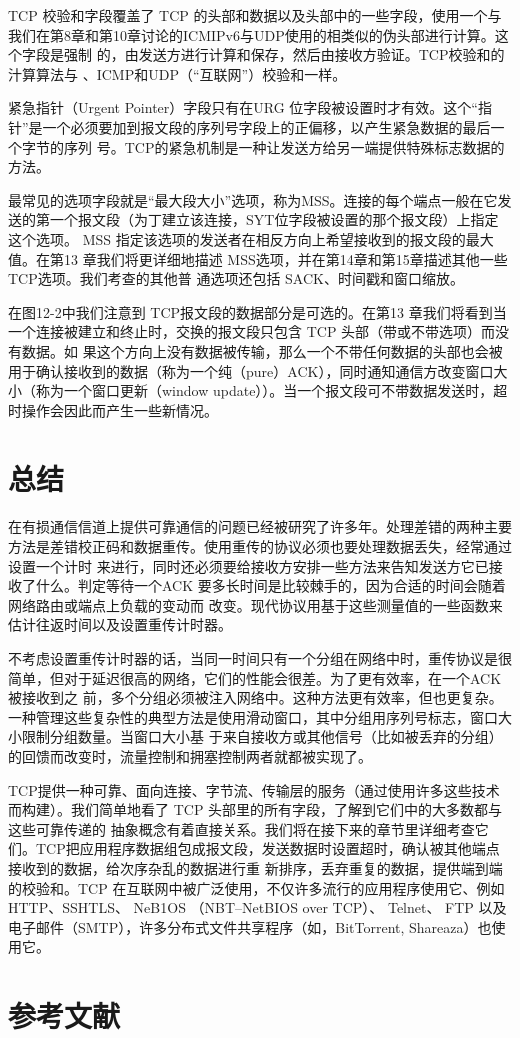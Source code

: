 TCP 校验和字段覆盖了 TCP 的头部和数据以及头部中的一些字段，使用一个与我们在第8章和第10章讨论的ICMIPv6与UDP使用的相类似的伪头部进行计算。这个字段是强制
的，由发送方进行计算和保存，然后由接收方验证。TCP校验和的汁算算法与 、ICMP和UDP（“互联网”）校验和一样。

紧急指针（Urgent Pointer）字段只有在URG 位字段被设置时才有效。这个“指针”是一个必须要加到报文段的序列号字段上的正偏移，以产生紧急数据的最后一个字节的序列
号。TCP的紧急机制是一种让发送方给另一端提供特殊标志数据的方法。

最常见的选项字段就是“最大段大小”选项，称为MSS。连接的每个端点一般在它发送的第一个报文段（为丁建立该连接，SYT位字段被设置的那个报文段）上指定这个选项。
MSS 指定该选项的发送者在相反方向上希望接收到的报文段的最大值。在第13 章我们将更详细地描述 MSS选项，并在第14章和第15章描述其他一些TCP选项。我们考查的其他普
通选项还包括 SACK、时间戳和窗口缩放。

在图12-2中我们注意到 TCP报文段的数据部分是可选的。在第13 章我们将看到当一个连接被建立和终止时，交换的报文段只包含 TCP 头部（带或不带选项）而没有数据。如
果这个方向上没有数据被传输，那么一个不带任何数据的头部也会被用于确认接收到的数据（称为一个纯（pure）ACK），同时通知通信方改变窗口大小（称为一个窗口更新（window
update））。当一个报文段可不带数据发送时，超时操作会因此而产生一些新情况。
\section{总结}
在有损通信信道上提供可靠通信的问题已经被研究了许多年。处理差错的两种主要方法是差错校正码和数据重传。使用重传的协议必须也要处理数据丢失，经常通过设置一个计时
来进行，同时还必须要给接收方安排一些方法来告知发送方它已接收了什么。判定等待一个ACK 要多长时间是比较棘手的，因为合适的时间会随着网络路由或端点上负载的变动而
改变。现代协议用基于这些测量值的一些函数来估计往返时间以及设置重传计时器。

不考虑设置重传计时器的话，当同一时间只有一个分组在网络中时，重传协议是很简单，但对于延迟很高的网络，它们的性能会很差。为了更有效率，在一个ACK 被接收到之
前，多个分组必须被注入网络中。这种方法更有效率，但也更复杂。一种管理这些复杂性的典型方法是使用滑动窗口，其中分组用序列号标志，窗口大小限制分组数量。当窗口大小基
于来自接收方或其他信号（比如被丢弃的分组）的回馈而改变时，流量控制和拥塞控制两者就都被实现了。

TCP提供一种可靠、面向连接、字节流、传输层的服务（通过使用许多这些技术而构建）。我们简单地看了 TCP 头部里的所有字段，了解到它们中的大多数都与这些可靠传递的
抽象概念有着直接关系。我们将在接下来的章节里详细考查它们。TCP把应用程序数据组包成报文段，发送数据时设置超时，确认被其他端点接收到的数据，给次序杂乱的数据进行重
新排序，丢弃重复的数据，提供端到端的校验和。TCP 在互联网中被广泛使用，不仅许多流行的应用程序使用它、例如 HTTP、SSHTLS、 NeB1OS （NBT--NetBIOS over TCP）、
Telnet、 FTP 以及电子邮件（SMTP），许多分布式文件共享程序（如，BitTorrent, Shareaza）也使用它。
\section{参考文献}